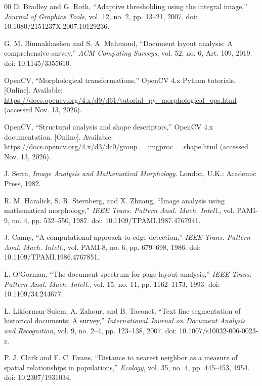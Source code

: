 \documentclass[conference]{IEEEtran}
\begin{document}
\begin{thebibliography}{00}
D. Bradley and G. Roth, ``Adaptive thresholding using the integral image,'' \emph{Journal of Graphics Tools}, vol. 12, no. 2, pp. 13--21, 2007. doi: 10.1080/2151237X.2007.10129236.

G. M. Binmakhashen and S. A. Mahmoud, ``Document layout analysis: A comprehensive survey,'' \emph{ACM Computing Surveys}, vol. 52, no. 6, Art. 109, 2019. doi: 10.1145/3355610.

OpenCV, ``Morphological transformations,'' OpenCV 4.x Python tutorials. [Online]. Available: \url{https://docs.opencv.org/4.x/d9/d61/tutorial_py_morphological_ops.html} (accessed Nov. 13, 2026).

OpenCV, ``Structural analysis and shape descriptors,'' OpenCV 4.x documentation. [Online]. Available: \url{https://docs.opencv.org/4.x/d3/dc0/group__imgproc__shape.html} (accessed Nov. 13, 2026).

J. Serra, \emph{Image Analysis and Mathematical Morphology}. London, U.K.: Academic Press, 1982.

R. M. Haralick, S. R. Sternberg, and X. Zhuang, ``Image analysis using mathematical morphology,'' \emph{IEEE Trans. Pattern Anal. Mach. Intell.}, vol. PAMI-9, no. 4, pp. 532--550, 1987. doi: 10.1109/TPAMI.1987.4767941.

J. Canny, ``A computational approach to edge detection,'' \emph{IEEE Trans. Pattern Anal. Mach. Intell.}, vol. PAMI-8, no. 6, pp. 679--698, 1986. doi: 10.1109/TPAMI.1986.4767851.

L. O'Gorman, ``The document spectrum for page layout analysis,'' \emph{IEEE Trans. Pattern Anal. Mach. Intell.}, vol. 15, no. 11, pp. 1162--1173, 1993. doi: 10.1109/34.244677.

L. Likforman-Sulem, A. Zahour, and B. Taconet, ``Text line segmentation of historical documents: A survey,'' \emph{International Journal on Document Analysis and Recognition}, vol. 9, no. 2--4, pp. 123--138, 2007. doi: 10.1007/s10032-006-0023-z.

P. J. Clark and F. C. Evans, ``Distance to nearest neighbor as a measure of spatial relationships in populations,'' \emph{Ecology}, vol. 35, no. 4, pp. 445--453, 1954. doi: 10.2307/1931034.

\end{thebibliography}
\end{document}
